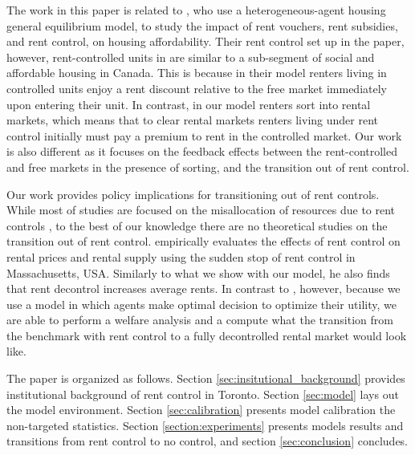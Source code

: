 \documentclass[parskip=full]{article}
\begin{document}
The work in this paper is related to \citet{fmn-2022}, who use a heterogeneous-agent housing general equilibrium model, to study the impact of rent vouchers, rent subsidies, and rent control, on housing affordability. Their rent control set up in the paper, however, rent-controlled units in \citet{fmn-2022} are similar to a sub-segment of social and affordable housing in Canada. This is because in their model renters living in controlled units enjoy a rent discount relative to the free market immediately upon entering their unit. In contrast, in our model renters sort into rental markets, which means that to clear rental markets renters living under rent control initially must pay a premium to rent in the controlled market. Our work is also different as it focuses on the feedback effects between the rent-controlled and free markets in the presence of sorting, and the transition out of rent control.

Our work provides policy implications for transitioning out of rent controls. While most of studies are focused on the misallocation of resources due to rent controls \citep{gl-2003}, to the best of our knowledge there are no theoretical studies on the transition out of rent control. \citet{sims-2007} empirically evaluates the effects of rent control on rental prices and rental supply using the sudden stop of rent control in Massachusetts, USA. Similarly to what we show with our model, he also finds that rent decontrol increases average rents. In contrast to \citet{sims-2007}, however, because we use a model in which agents make optimal decision to optimize their utility, we are able to perform a welfare analysis and a compute what the transition from the benchmark with rent control to a fully decontrolled rental market would look like. %

The paper is organized as follows. Section \ref{sec:insitutional_background} provides institutional background of rent control in Toronto. Section \ref{sec:model} lays out the model environment. Section \ref{sec:calibration} presents model calibration the non-targeted statistics. Section \ref{section:experiments} presents models results and transitions from rent control to no control, and section \ref{sec:conclusion} concludes. 
\end{document}
